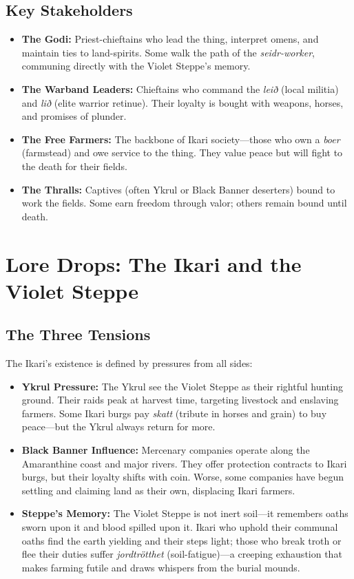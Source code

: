 \documentclass[12pt]{article}
\begin{document}
\subsection{Key Stakeholders}
\begin{itemize}[leftmargin=*]
  \item \textbf{The Godi:} Priest-chieftains who lead the thing, interpret omens, and maintain ties to land-spirits. Some walk the path of the \textit{seidr-worker}, communing directly with the Violet Steppe's memory.
  \item \textbf{The Warband Leaders:} Chieftains who command the \textit{leið} (local militia) and \textit{lið} (elite warrior retinue). Their loyalty is bought with weapons, horses, and promises of plunder.
  \item \textbf{The Free Farmers:} The backbone of Ikari society---those who own a \textit{boer} (farmstead) and owe service to the thing. They value peace but will fight to the death for their fields.
  \item \textbf{The Thralls:} Captives (often Ykrul or Black Banner deserters) bound to work the fields. Some earn freedom through valor; others remain bound until death.
\end{itemize}

\section{Lore Drops: The Ikari and the Violet Steppe}

\subsection{The Three Tensions}
The Ikari's existence is defined by pressures from all sides:
\begin{itemize}[leftmargin=*]
  \item \textbf{Ykrul Pressure:} The Ykrul see the Violet Steppe as their rightful hunting ground. Their raids peak at harvest time, targeting livestock and enslaving farmers. Some Ikari burgs pay \textit{skatt} (tribute in horses and grain) to buy peace---but the Ykrul always return for more.
  \item \textbf{Black Banner Influence:} Mercenary companies operate along the Amaranthine coast and major rivers. They offer protection contracts to Ikari burgs, but their loyalty shifts with coin. Worse, some companies have begun settling and claiming land as their own, displacing Ikari farmers.
  \item \textbf{Steppe's Memory:} The Violet Steppe is not inert soil---it remembers oaths sworn upon it and blood spilled upon it. Ikari who uphold their communal oaths find the earth yielding and their steps light; those who break troth or flee their duties suffer \textit{jordtrötthet} (soil-fatigue)---a creeping exhaustion that makes farming futile and draws whispers from the burial mounds.
\end{itemize}
\end{document}
